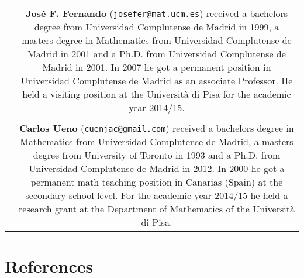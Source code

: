 \documentclass[1p]{elsarticle}
\begin{document}
\vspace{-5mm}
\section*{}
\begin{center}
\begin{tabular}{cc}
\raisebox{-0.5cm}{\texttt{[image: jose.jpg]}}&
\begin{minipage}{10.6cm}
{\bf Jos\'e F. Fernando} ({\tt josefer@mat.ucm.es}) 
received a bachelors degree from Universidad Complutense de Madrid in 1999, a masters degree in Mathematics from Universidad Complutense de Madrid in 2001 and a Ph.D. from Universidad Complutense de Madrid in 2001. In 2007 he got a permanent position in Universidad Complutense de Madrid as an associate Professor. He held a visiting position at the Universit\`a di Pisa for the academic year 2014/15. 
\end{minipage}\\
& \\
\raisebox{-0.5cm}{\texttt{[image: ueno.jpg]}}&
\begin{minipage}{10.6cm}
{\bf Carlos Ueno} ({\tt cuenjac@gmail.com}) received a bachelors degree in Mathematics from Universidad Complutense de Madrid, a masters degree from University of Toronto in 1993 and a Ph.D. from Universidad Complutense de Madrid in 2012. In 2000 he got a permanent math teaching position in Canarias (Spain) at the secondary school level. For the academic year 2014/15 he held a research grant at the Department of Mathematics of the Universit\`a di Pisa.
\end{minipage}
\end{tabular}
\end{center}

\section*{References}


\end{document}
